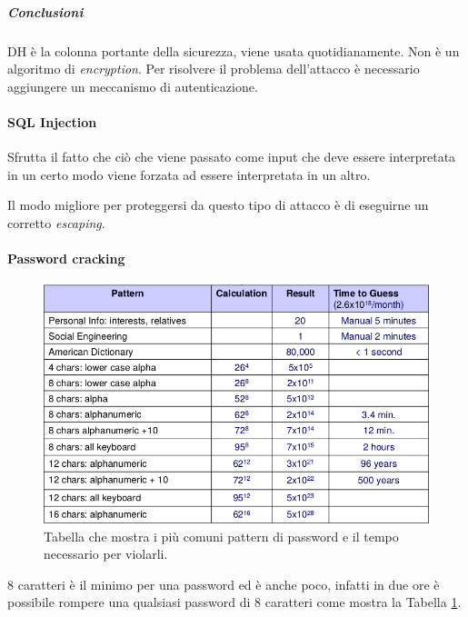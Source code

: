 \subparagraph{Conclusioni}

DH è la colonna portante della sicurezza, viene usata quotidianamente. Non è un
algoritmo di \textit{encryption}.
Per risolvere il problema dell'attacco è necessario aggiungere un meccanismo di
autenticazione.

\paragraph{SQL Injection}

Sfrutta il fatto che ciò che viene passato come input che deve essere
interpretata in un certo modo viene forzata ad essere interpretata in un altro.

Il modo migliore per proteggersi da questo tipo di attacco è di eseguirne un
corretto \textit{escaping}.

\paragraph{Password cracking}

\begin{figure}[h!]
        \begin{center}

\includegraphics[scale=0.65]{res/img/password_cracking_table.png}
        \end{center}
        \caption{Tabella che mostra i più comuni pattern di password e il tempo
necessario per violarli.}
        \label{fig:password:cracking:table}
\end{figure}

8 caratteri è il minimo per una password ed è anche poco, infatti in due ore è
possibile rompere una qualsiasi password di 8 caratteri come mostra la Tabella
\ref{fig:password:cracking:table}.
